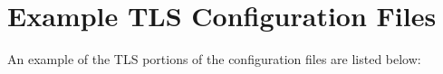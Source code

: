 % 
% 
% 
% 
% 


\section{Example TLS Configuration Files}

An example of the TLS portions of the configuration
files are listed below:

